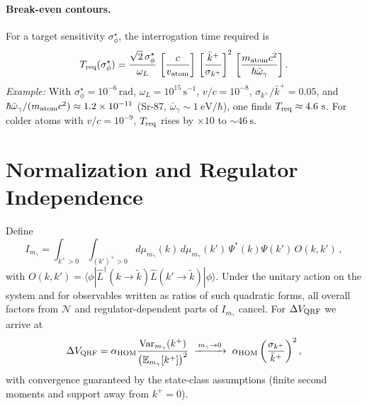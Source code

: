\documentclass[aps,11pt]{article}
\providecommand{\bra}[1]{\langle #1|}
\providecommand{\ket}[1]{|#1\rangle}
\newcommand{\Var}{\mathrm{Var}}
\newcommand{\E}{\mathbb{E}}
\newcommand{\kplus}{k^{+}}
\newcommand{\kbar}{\bar{k}^{+}}
\newcommand{\alphahom}{\alpha_{\text{HOM}}}
\begin{document}
\paragraph{Break-even contours.}
For a target sensitivity \(\sigma_\phi^\star\), the interrogation time required is
\begin{equation}
T_{\rm req}(\sigma_\phi^\star)=
\frac{\sqrt{2}\,\sigma_\phi^\star}{\omega_L}\,
\left[\frac{c}{v_{\rm atom}}\right]\,
\left[\frac{\kbar}{\sigma_{\kplus}}\right]^{2}\,
\left[\frac{m_{\rm atom}c^{2}}{\hbar\bar\omega_\gamma}\right].
\end{equation}
\emph{Example:} With \(\sigma_\phi^\star=10^{-6}\,\mathrm{rad}\), \(\omega_L=10^{15}\,\mathrm{s}^{-1}\), \(v/c=10^{-8}\), \(\sigma_{\kplus}/\kbar=0.05\), and \(\hbar\bar\omega_\gamma/(m_{\rm atom}c^{2})\approx 1.2\times10^{-11}\) (Sr-87, \(\bar\omega_\gamma\sim 1~\mathrm{eV}/\hbar\)), one finds \(T_{\rm req}\approx 4.6~\mathrm{s}\). For colder atoms with \(v/c=10^{-9}\), \(T_{\rm req}\) rises by \(\times 10\) to \(\sim 46~\mathrm{s}\).

\section{Normalization and Regulator Independence}\label{app:D}
Define
\begin{equation}
I_{m_\gamma}=\int_{\kplus>0}\!\!\int_{(k')^{+}>0}\!
d\mu_{m_\gamma}(k)\, d\mu_{m_\gamma}(k')\, \Psi^*(k)\Psi(k')\, O(k,k')\,,
\end{equation}
with \(O(k,k')=\bra{\phi} \hat L^\dagger(k\!\to\!\tilde k)\hat L(k'\!\to\!\tilde k)\ket{\phi}\).
Under the unitary action on the system and for observables written as ratios of such quadratic forms, all overall factors from \(\mathcal N\) and regulator-dependent parts of \(I_{m_\gamma}\) cancel. For \(\Delta V_{\rm QRF}\) we arrive at
\begin{equation}
\Delta V_{\rm QRF}= \alphahom \frac{\Var_{m_\gamma}(\kplus)}{\big(\E_{m_\gamma}[\kplus]\big)^{2}}
\;\xrightarrow[]{\,m_\gamma\to 0\,}\;
\alphahom \left(\frac{\sigma_{\kplus}}{\kbar}\right)^{2},
\end{equation}
with convergence guaranteed by the state-class assumptions (finite second moments and support away from \(\kplus=0\)).
\end{document}
